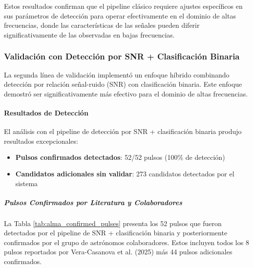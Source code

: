 Estos resultados confirman que el pipeline clásico requiere ajustes específicos en sus parámetros de detección para operar efectivamente en el dominio de altas frecuencias, donde las características de las señales pueden diferir significativamente de las observadas en bajas frecuencias.

\subsubsection{Validación con Detección por SNR + Clasificación Binaria}

La segunda línea de validación implementó un enfoque híbrido combinando detección por relación señal-ruido (SNR) con clasificación binaria. Este enfoque demostró ser significativamente más efectivo para el dominio de altas frecuencias.

\paragraph{Resultados de Detección}

El análisis con el pipeline de detección por SNR + clasificación binaria produjo resultados excepcionales:

\begin{itemize}
    \item \textbf{Pulsos confirmados detectados}: 52/52 pulsos (100\% de detección)
    \item \textbf{Candidatos adicionales sin validar}: 273 candidatos detectados por el sistema
\end{itemize}

\subparagraph{Pulsos Confirmados por Literatura y Colaboradores}

La Tabla \ref{tab:alma_confirmed_pulses} presenta los 52 pulsos que fueron detectados por el pipeline de SNR + clasificación binaria y posteriormente confirmados por el grupo de astrónomos colaboradores. Estos incluyen todos los 8 pulsos reportados por Vera-Casanova et al. (2025) más 44 pulsos adicionales confirmados.

